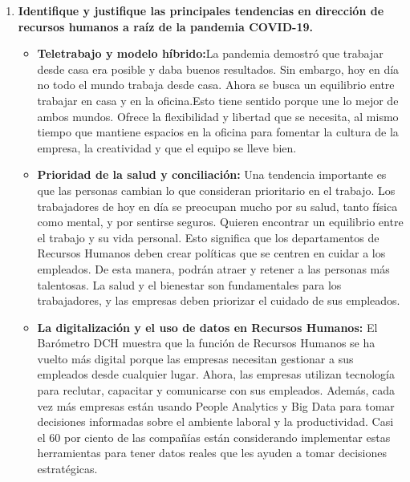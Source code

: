 \documentclass[12pt, a4paper]{article}
\begin{document}
\begin{enumerate}[label=\textbf{6.}, leftmargin=*, topsep=10pt]

    \item \textbf{Identifique y justifique las principales tendencias en dirección de recursos humanos a raíz de la pandemia COVID-19.} \\
    
        \begin{itemize}
            \item \textbf{Teletrabajo y modelo híbrido:}La pandemia demostró que trabajar 
            desde casa era posible y daba buenos resultados.
            Sin embargo, hoy en día no todo el mundo trabaja desde casa. Ahora se busca un
             equilibrio entre trabajar en casa y en la oficina.Esto tiene sentido porque une 
             lo mejor de ambos mundos. Ofrece la flexibilidad y libertad que se necesita, 
             al mismo tiempo que mantiene espacios en la oficina para fomentar la cultura de 
             la empresa, la creatividad y que el equipo se lleve bien.
             \item \textbf{Prioridad de la salud y conciliación:} Una tendencia importante es que las personas cambian lo que consideran prioritario
 en el trabajo. Los trabajadores de hoy en día se preocupan mucho por su salud, tanto física como mental, y por sentirse seguros. Quieren encontrar un equilibrio entre el trabajo y su vida personal. Esto significa que los departamentos de Recursos Humanos deben crear políticas que se centren en cuidar a los empleados. De esta manera, podrán atraer y retener a las personas más talentosas. La salud y el bienestar son fundamentales para los trabajadores, y las empresas deben priorizar el cuidado de sus empleados.

            \item \textbf{La digitalización y el uso de datos en Recursos Humanos:}
El Barómetro DCH muestra que la función de Recursos Humanos se ha vuelto más digital porque las
 empresas necesitan gestionar a sus empleados desde cualquier lugar. Ahora, las empresas utilizan 
 tecnología para reclutar, capacitar y comunicarse con sus empleados. Además, cada vez más empresas
  están usando People Analytics y Big Data para tomar decisiones informadas sobre el ambiente laboral 
  y la productividad. Casi el 60 por ciento de las compañías están considerando implementar estas 
  herramientas para tener datos reales que les ayuden a tomar decisiones estratégicas.
\end{itemize}
    

\end{enumerate}
\end{document}
